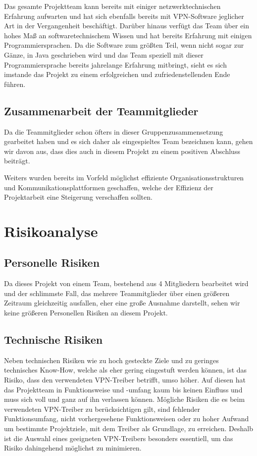 \documentclass[a4paper,12pt]{scrreprt}
\begin{document}
		
		Das gesamte Projektteam kann bereits mit einiger netzwerktechnischen Erfahrung aufwarten und hat sich ebenfalls bereits mit VPN-Software jeglicher Art in der Vergangenheit beschäftigt. Darüber hinaus verfügt das Team über ein hohes Maß an softwaretechnischem Wissen und hat bereits Erfahrung mit einigen Programmiersprachen. Da die Software zum größten Teil, wenn nicht sogar zur Gänze, in Java geschrieben wird und das Team speziell mit dieser Programmiersprache bereits jahrelange Erfahrung mitbringt, sieht es sich imstande das Projekt zu einem erfolgreichen und zufriedenstellenden Ende führen.
		
		\subsection{Zusammenarbeit der Teammitglieder}
		
		
		Da die Teammitglieder schon öfters in dieser Gruppenzusammensetzung gearbeitet haben und es sich daher als eingespieltes Team bezeichnen kann, gehen wir davon aus, dass dies auch in diesem Projekt zu einem positiven Abschluss beiträgt.
		
		Weiters wurden bereits im Vorfeld möglichst effiziente Organisationsstrukturen und Kommunikationsplattformen geschaffen, welche der Effizienz der Projektarbeit eine Steigerung verschaffen sollten.
			
	\section{Risikoanalyse}
		
		\subsection{Personelle Risiken}
		Da dieses Projekt von einem Team, bestehend aus 4 Mitgliedern bearbeitet wird und der schlimmste Fall, das mehrere Teammitglieder über einen größeren Zeitraum gleichzeitig ausfallen, eher eine große Ausnahme darstellt, sehen wir keine größeren Personellen Risiken an diesem Projekt.
		
		\subsection{Technische Risiken}
		Neben technischen Risiken wie zu hoch gesteckte Ziele und zu geringes technisches Know-How, welche als eher gering eingestuft werden können, ist das Risiko, dass den verwendeten VPN-Treiber betrifft, umso höher. Auf diesen hat das Projektteam in Funktionsweise und -umfang kaum bis keinen Einfluss und muss sich voll und ganz auf ihn verlassen können. Mögliche Risiken die es beim verwendeten VPN-Treiber zu berücksichtigen gilt, sind fehlender Funktionsumfang, nicht vorhergesehene Funktionsweisen oder zu hoher Aufwand um bestimmte Projektziele, mit dem Treiber als Grundlage, zu erreichen. Deshalb ist die Auswahl eines geeigneten VPN-Treibers besonders essentiell, um das Risiko dahingehend möglichst zu minimieren. 
		
\end{document}
